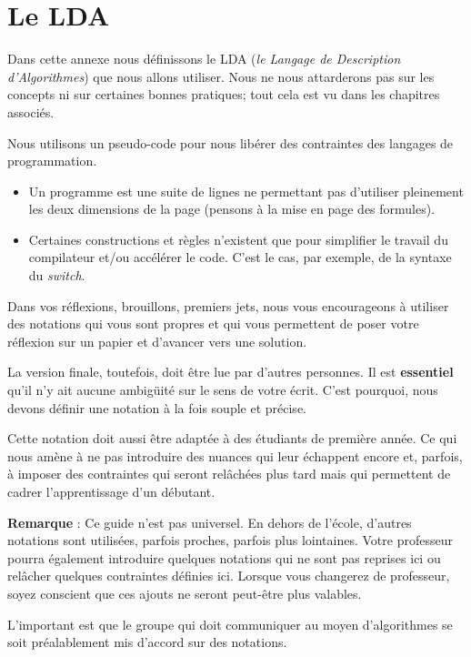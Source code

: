 \chapter{Le LDA}

	Dans cette annexe nous définissons le LDA
	(\emph{le Langage de Description d'Algorithmes})
	que nous allons utiliser. 
	Nous ne nous attarderons pas sur les concepts
	ni sur certaines bonnes pratiques;
	tout cela est vu dans les chapitres associés.
	
	Nous utilisons un pseudo-code pour nous libérer 
	des contraintes des langages de programmation.
	\begin{itemize}
	\item
		Un programme est une suite de lignes
		ne permettant pas d'utiliser pleinement les
		deux dimensions de la page 
		(pensons à la mise en page des formules).
	\item
		Certaines constructions et règles
		n'existent que pour simplifier le travail du compilateur
		et/ou accélérer le code.
		C'est le cas, par exemple, de la syntaxe du \emph{switch}.
	\end{itemize}
	
	Dans vos réflexions, brouillons, premiers jets,
	nous vous encourageons à utiliser des notations
	qui vous sont propres et qui vous permettent
	de poser votre réflexion sur un papier
	et d'avancer vers une solution.
	
	La version finale, toutefois, 
	doit être lue par d'autres personnes.
	Il est \textbf{essentiel} qu'il n'y ait aucune ambigüité
	sur le sens de votre écrit.
	C'est pourquoi, nous devons définir une notation
	à la fois souple et précise.
	
	Cette notation doit aussi être adaptée à des étudiants de première année.
	Ce qui nous amène à ne pas introduire des nuances qui leur échappent encore
	et, parfois, à imposer des contraintes qui seront relâchées plus tard
	mais qui permettent de cadrer l'apprentissage d'un débutant.
	
	\textbf{Remarque} : Ce guide n'est pas universel.
	En dehors de l'école, d'autres notations sont utilisées,
	parfois proches, parfois plus lointaines.
	Votre professeur pourra également introduire quelques notations
	qui ne sont pas reprises ici 
	ou relâcher quelques contraintes définies ici. 
	Lorsque vous changerez de professeur,
	soyez conscient que ces ajouts ne seront peut-être plus valables.
	
	L'important est que le groupe qui doit communiquer
	au moyen d'algorithmes se soit préalablement mis d'accord 
	sur des notations.

